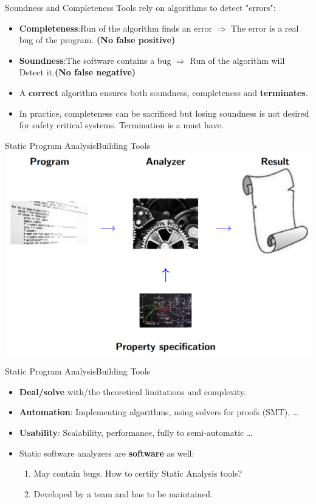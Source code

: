 \begin{frame}{Soundness and Completeness}
Tools rely on algorithms to detect "errors":
\begin{itemize}
	\item \textbf{Completeness}:\newline Run of the algorithm finds an error $\Rightarrow$ The error is a real bug of the program.
	 \textbf{(No false positive)}
	\item \textbf{Soundness}:\newline The software contains a bug $\Rightarrow$  Run of the algorithm will Detect it.\textbf{(No false negative)}
	\item A \textbf{correct} algorithm ensures both soundness, completeness and  \textbf{terminates}. 
	\item In practice, completeness can be sacrificed but losing soundness is not desired for safety critical systems. Termination is a must have.
\end{itemize}
\end{frame}

\begin{frame}{Static Program Analysis}{Building Tools}
\centering \includegraphics[scale=0.50]{content/images/static-analysis/tool.png}
\end{frame}



\begin{frame}{Static Program Analysis}{Building Tools}
\begin{itemize}
	\item \textbf{Deal/solve} with/the theoretical limitations and complexity.
	\item \textbf{Automation}: Implementing algorithms, using solvers for proofs (SMT), \dots
	\item \textbf{Usability}: Scalability, performance, fully to semi-automatic \dots
	\item Static software analyzers are \textbf{software} as well: 
	\begin{enumerate}
		\item May contain bugs. How to certify Static Analysis tools?
		\item Developed by a team and has to be maintained.
	\end{enumerate} 
\end{itemize}
\end{frame}


